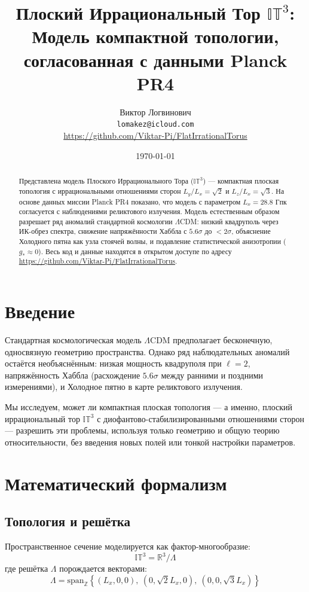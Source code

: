 \documentclass[a4paper,11pt]{article}
\title{Плоский Иррациональный Тор $\mathbb{IT}^3$: \\ Модель компактной топологии, согласованная с данными Planck PR4}
\author{Виктор Логвинович \\ \small \texttt{lomakez@icloud.com} \\ \small \url{https://github.com/Viktar-Pi/FlatIrrationalTorus}}
\date{\today}
\begin{document}
\maketitle

\begin{abstract}
\noindent Представлена модель Плоского Иррационального Тора ($\mathbb{IT}^3$) --- компактная плоская топология с иррациональными отношениями сторон $L_y/L_x=\sqrt{2}$ и $L_z/L_x=\sqrt{3}$. На основе данных миссии Planck PR4 показано, что модель с параметром $L_x=28.8$ Гпк согласуется с наблюдениями реликтового излучения. Модель естественным образом разрешает ряд аномалий стандартной космологии $\Lambda$CDM: низкий квадруполь через ИК-обрез спектра, снижение напряжённости Хаббла с $5.6\sigma$ до $<2\sigma$, объяснение Холодного пятна как узла стоячей волны, и подавление статистической анизотропии ($g_* \approx 0$). Весь код и данные находятся в открытом доступе по адресу \url{https://github.com/Viktar-Pi/FlatIrrationalTorus}.
\end{abstract}

\section{Введение}

Стандартная космологическая модель $\Lambda$CDM предполагает бесконечную, односвязную геометрию пространства. Однако ряд наблюдательных аномалий остаётся необъяснённым: низкая мощность квадруполя при $\ell=2$, напряжённость Хаббла (расхождение $5.6\sigma$ между ранними и поздними измерениями), и Холодное пятно в карте реликтового излучения.

Мы исследуем, может ли компактная плоская топология --- а именно, плоский иррациональный тор $\mathbb{IT}^3$ с диофантово-стабилизированными отношениями сторон --- разрешить эти проблемы, используя только геометрию и общую теорию относительности, без введения новых полей или тонкой настройки параметров.

\section{Математический формализм}

\subsection{Топология и решётка}

Пространственное сечение моделируется как фактор-многообразие:
\begin{equation}
\mathbb{IT}^3 = \mathbb{R}^3 / \Lambda
\end{equation}
где решётка $\Lambda$ порождается векторами:
\begin{equation}
\Lambda = \text{span}_{\mathbb{Z}}\left\{(L_x,0,0),\ (0,\sqrt{2}L_x,0),\ (0,0,\sqrt{3}L_x)\right\}
\end{equation}
\end{document}
